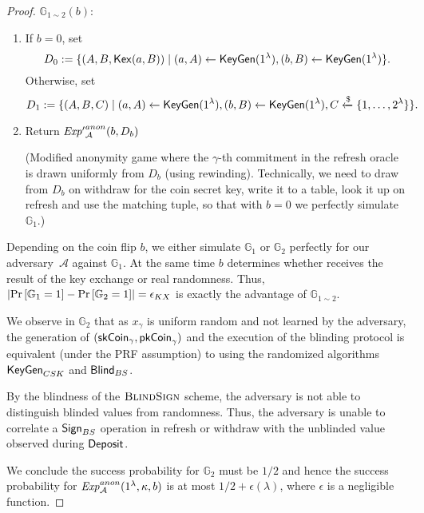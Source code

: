 \begin{proof}
  \bigskip
  \noindent $\mathbb{G}_{1 \sim 2}(b)$:
  \vspace{-0.5\topsep}
  \begin{enumerate}
    \setlength\itemsep{0em}
    \item If $b=0$, set
      \[
        D_0 := \{ (A, B, \mathsf{Kex}(a, B)) \mid (a, A) \leftarrow \mathsf{KeyGen}(1^\lambda),(b, B) \leftarrow \mathsf{KeyGen}(1^\lambda) \}.
      \]
      Otherwise, set
      \[
        D_1 := \{ (A, B, C) \mid (a, A) \leftarrow \mathsf{KeyGen}(1^\lambda),
           (b, B) \leftarrow \mathsf{KeyGen}(1^\lambda),
           C \xleftarrow{\text{\$}} \{1,\dots,2^\lambda\} \}.
      \]

    \item Return $\mathit{Exp'}_{\cal A}^{anon}(b, D_b)$

      (Modified anonymity game where the $\gamma$-th commitment in the
      refresh oracle is drawn uniformly from $D_b$ (using rewinding).  Technically, we need to
      draw from $D_b$ on withdraw for the coin secret key, write it to a table, look it up on refresh and
      use the matching tuple, so that with $b=0$ we perfectly simulate $\mathbb{G}_1$.)
  \end{enumerate}

  Depending on the coin flip $b$, we either simulate
  $\mathbb{G}_1$ or $\mathbb{G}_2$ perfectly for our adversary~$\mathcal{A}$
  against $\mathbb{G}_1$.  At the same time $b$ determines whether 
  receives the result of the key exchange or real randomness.  Thus, $\left|
  \Pr\left [\mathbb{G}_1 = 1 \right ] - \Pr\left [\mathbb{G}_2 = 1 \right ] \right| = \epsilon_{KX}$ is
  exactly the advantage of $\mathbb{G}_{1 \sim 2}$.

  We observe in $\mathbb{G}_2$ that as $x_\gamma$ is uniform random and not
  learned by the adversary,  the generation of $(\mathsf{skCoin}_\gamma,
  \mathsf{pkCoin}_\gamma)$ and the execution of the blinding protocol is equivalent (under the PRF assumption)
  to using the randomized algorithms
  $\mathsf{KeyGen}_{CSK}$ and $\mathsf{Blind}_{BS}$.

  By the blindness of the $\textsc{BlindSign}$ scheme, the adversary is not
  able to distinguish blinded values from randomness.  Thus, the adversary is
  unable to correlate a $\mathsf{Sign}_{BS}$ operation in refresh or withdraw
  with the unblinded value observed during $\mathsf{Deposit}$.

  We conclude the success probability for $\mathbb{G}_2$ must be $1/2$ and
  hence the success probability for $\mathit{Exp}_{\cal A}^{anon}(1^\lambda,
  \kappa, b)$ is at most $1/2 + \epsilon(\lambda)$, where $\epsilon$ is a
  negligible function.
\end{proof}

